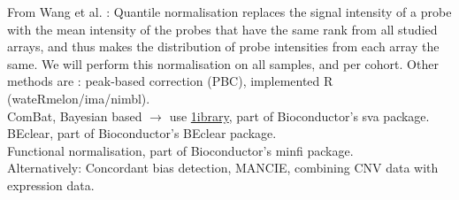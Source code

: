 \documentclass[a4paper,10pt]{article}
\begin{document}
From Wang et al. \cite{Wang2015}: Quantile normalisation replaces the signal intensity of a probe with the mean intensity of the probes that have the same rank from all studied arrays, and thus makes the distribution of probe intensities from each array the same. We will perform this normalisation 
on all samples, and per cohort.
%
Other methods are :
peak-based correction (PBC), implemented R (wateRmelon/ima/nimbl). \\ 
%
ComBat, Bayesian based $\rightarrow$ use \href{http://www.bu.edu/jlab/wp-assets/ComBat/Abstract.html}{1ibrary}, part of Bioconductor's sva package. \\
%
BEclear, part of Bioconductor's BEclear package. \\
%
Functional normalisation, part of Bioconductor's minfi package. \\
%
Alternatively: Concordant bias detection, MANCIE, combining CNV data with expression data.



\end{document}

